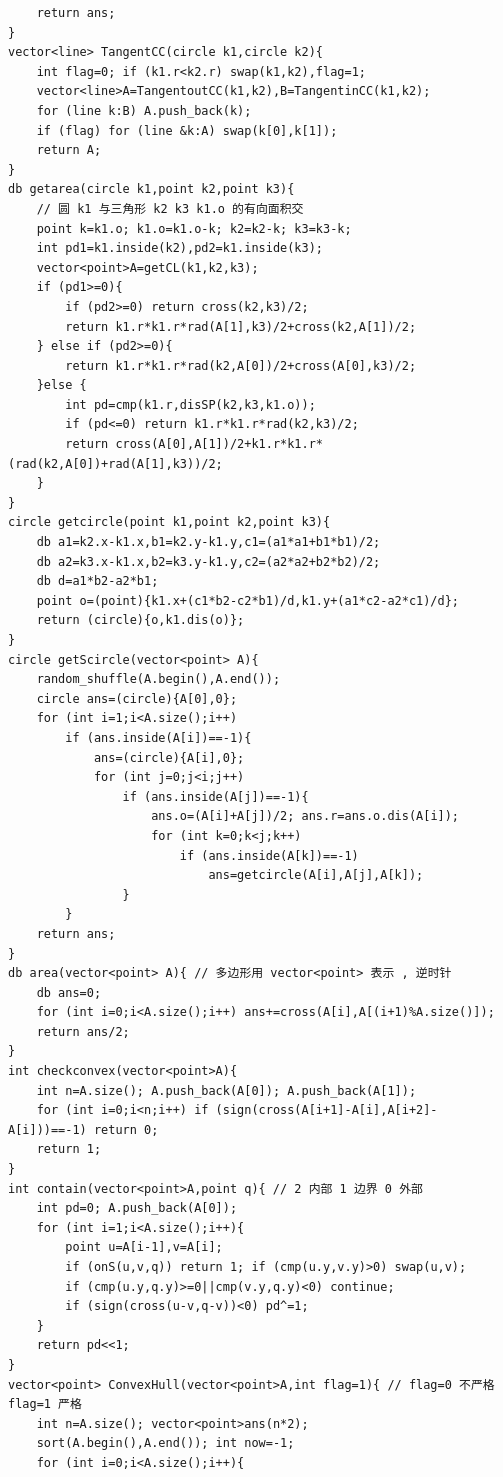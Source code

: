 \documentclass[twoside]{article}
\begin{document}
\begin{lstlisting}
    return ans;
}
vector<line> TangentCC(circle k1,circle k2){
    int flag=0; if (k1.r<k2.r) swap(k1,k2),flag=1;
    vector<line>A=TangentoutCC(k1,k2),B=TangentinCC(k1,k2);
    for (line k:B) A.push_back(k); 
    if (flag) for (line &k:A) swap(k[0],k[1]);
    return A;
}
db getarea(circle k1,point k2,point k3){
    // 圆 k1 与三角形 k2 k3 k1.o 的有向面积交
    point k=k1.o; k1.o=k1.o-k; k2=k2-k; k3=k3-k;
    int pd1=k1.inside(k2),pd2=k1.inside(k3); 
    vector<point>A=getCL(k1,k2,k3);
    if (pd1>=0){
        if (pd2>=0) return cross(k2,k3)/2;
        return k1.r*k1.r*rad(A[1],k3)/2+cross(k2,A[1])/2;
    } else if (pd2>=0){ 
        return k1.r*k1.r*rad(k2,A[0])/2+cross(A[0],k3)/2;
    }else {
        int pd=cmp(k1.r,disSP(k2,k3,k1.o));
        if (pd<=0) return k1.r*k1.r*rad(k2,k3)/2;
        return cross(A[0],A[1])/2+k1.r*k1.r*(rad(k2,A[0])+rad(A[1],k3))/2;
    }
}
circle getcircle(point k1,point k2,point k3){
    db a1=k2.x-k1.x,b1=k2.y-k1.y,c1=(a1*a1+b1*b1)/2;
    db a2=k3.x-k1.x,b2=k3.y-k1.y,c2=(a2*a2+b2*b2)/2;
    db d=a1*b2-a2*b1;
    point o=(point){k1.x+(c1*b2-c2*b1)/d,k1.y+(a1*c2-a2*c1)/d};
    return (circle){o,k1.dis(o)};
}
circle getScircle(vector<point> A){
    random_shuffle(A.begin(),A.end());
    circle ans=(circle){A[0],0};
    for (int i=1;i<A.size();i++)
        if (ans.inside(A[i])==-1){
            ans=(circle){A[i],0};
            for (int j=0;j<i;j++)
                if (ans.inside(A[j])==-1){
                    ans.o=(A[i]+A[j])/2; ans.r=ans.o.dis(A[i]);
                    for (int k=0;k<j;k++)
                        if (ans.inside(A[k])==-1)
                            ans=getcircle(A[i],A[j],A[k]);
                }
        }
    return ans;
}
db area(vector<point> A){ // 多边形用 vector<point> 表示 , 逆时针 
    db ans=0;
    for (int i=0;i<A.size();i++) ans+=cross(A[i],A[(i+1)%A.size()]);
    return ans/2;
}
int checkconvex(vector<point>A){
    int n=A.size(); A.push_back(A[0]); A.push_back(A[1]);
    for (int i=0;i<n;i++) if (sign(cross(A[i+1]-A[i],A[i+2]-A[i]))==-1) return 0;
    return 1;
}
int contain(vector<point>A,point q){ // 2 内部 1 边界 0 外部
    int pd=0; A.push_back(A[0]);
    for (int i=1;i<A.size();i++){
        point u=A[i-1],v=A[i];
        if (onS(u,v,q)) return 1; if (cmp(u.y,v.y)>0) swap(u,v);
        if (cmp(u.y,q.y)>=0||cmp(v.y,q.y)<0) continue;
        if (sign(cross(u-v,q-v))<0) pd^=1;
    }
    return pd<<1;
}
vector<point> ConvexHull(vector<point>A,int flag=1){ // flag=0 不严格 flag=1 严格 
    int n=A.size(); vector<point>ans(n*2); 
    sort(A.begin(),A.end()); int now=-1;
    for (int i=0;i<A.size();i++){

\end{lstlisting}
\end{document}
